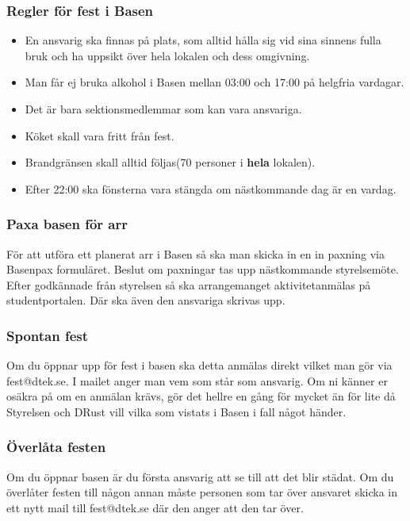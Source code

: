 \subsubsection{Regler för fest i Basen}
\begin{itemize}
    \item En ansvarig ska finnas på plats, som alltid hålla sig vid sina sinnens fulla bruk och ha uppsikt över hela lokalen och dess omgivning.
    \item Man får ej bruka alkohol i Basen mellan 03:00 och 17:00 på helgfria vardagar.
    \item Det är bara sektionsmedlemmar som kan vara ansvariga.
    \item Köket skall vara fritt från fest.
    \item Brandgränsen skall alltid följas(70 personer i \textbf{hela} lokalen).
    \item Efter 22:00 ska fönsterna vara stängda om nästkommande dag är en vardag.
\end{itemize}

\subsubsection{Paxa basen för arr}
För att utföra ett planerat arr i Basen så ska man skicka in en in paxning via Basenpax formuläret. Beslut om paxningar tas upp nästkommande styrelsemöte.
Efter godkännade från styrelsen så ska arrangemanget aktivitetanmälas på studentportalen. Där ska även den ansvariga skrivas upp.

\subsubsection{Spontan fest}
Om du öppnar upp för fest i basen ska detta anmälas direkt vilket man gör via fest@dtek.se.
I mailet anger man vem som står som ansvarig. Om ni känner er osäkra på om en anmälan
krävs, gör det hellre en gång för mycket än för lite då Styrelsen och DRust vill vilka som
vistats i Basen i fall något händer.

\subsubsection{Överlåta festen}
Om du öppnar basen är du första ansvarig att se till att det blir städat. Om du överlåter
festen till någon annan måste personen som tar över ansvaret skicka in ett nytt mail till
fest@dtek.se där den anger att den tar över.

